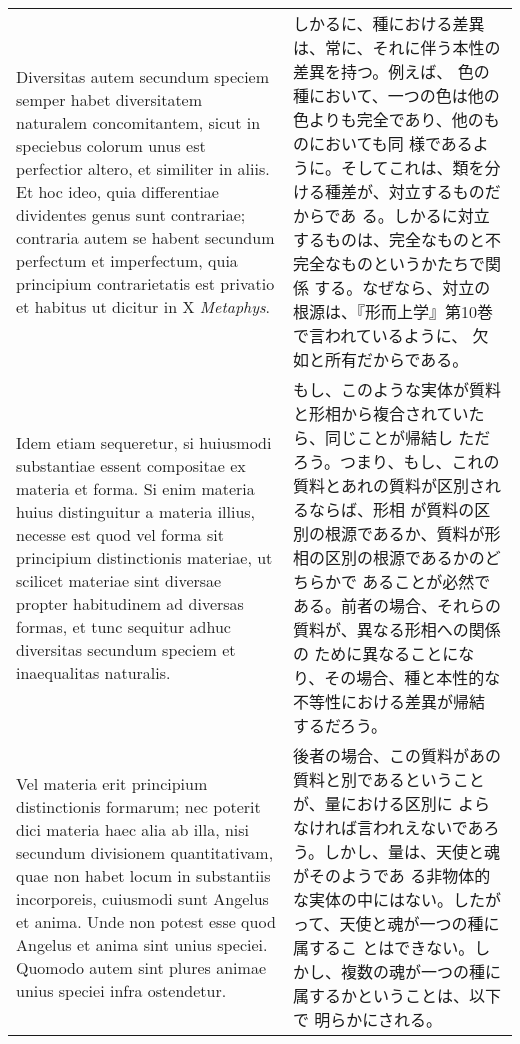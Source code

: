 \documentclass[paper=a4paper,fontsize=10pt,jafontsize=9pt,titlepage]{jlreq}
\begin{document}
\begin{longtable}{p{21em}p{21em}}
\\

Diversitas autem secundum speciem semper habet diversitatem naturalem
concomitantem, sicut in speciebus colorum unus est perfectior altero,
et similiter in aliis. Et hoc ideo, quia differentiae dividentes genus
sunt contrariae; contraria autem se habent secundum perfectum et
imperfectum, quia principium contrarietatis est privatio et habitus ut
dicitur in X {\itshape Metaphys}.

&

しかるに、種における差異は、常に、それに伴う本性の差異を持つ。例えば、
色の種において、一つの色は他の色よりも完全であり、他のものにおいても同
様であるように。そしてこれは、類を分ける種差が、対立するものだからであ
る。しかるに対立するものは、完全なものと不完全なものというかたちで関係
する。なぜなら、対立の根源は、『形而上学』第10巻で言われているように、
欠如と所有だからである。
 
\\


Idem etiam sequeretur, si huiusmodi substantiae essent compositae ex
materia et forma. Si enim materia huius distinguitur a materia illius,
necesse est quod vel forma sit principium distinctionis materiae, ut
scilicet materiae sint diversae propter habitudinem ad diversas
formas, et tunc sequitur adhuc diversitas secundum speciem et
inaequalitas naturalis.

&

もし、このような実体が質料と形相から複合されていたら、同じことが帰結し
ただろう。つまり、もし、これの質料とあれの質料が区別されるならば、形相
が質料の区別の根源であるか、質料が形相の区別の根源であるかのどちらかで
あることが必然である。前者の場合、それらの質料が、異なる形相への関係の
ために異なることになり、その場合、種と本性的な不等性における差異が帰結
するだろう。
 
\\


Vel materia erit principium distinctionis
 formarum; nec poterit dici materia haec alia ab illa, nisi secundum
 divisionem quantitativam, quae non habet locum in substantiis
 incorporeis, cuiusmodi sunt Angelus et anima. Unde non potest esse
 quod Angelus et anima sint unius speciei. Quomodo autem sint plures
 animae unius speciei infra ostendetur.

&

後者の場合、この質料があの質料と別であるということが、量における区別に
よらなければ言われえないであろう。しかし、量は、天使と魂がそのようであ
る非物体的な実体の中にはない。したがって、天使と魂が一つの種に属するこ
とはできない。しかし、複数の魂が一つの種に属するかということは、以下で
明らかにされる。
 

\end{longtable}
\end{document}
